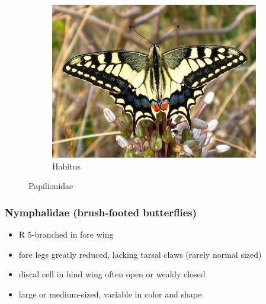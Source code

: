 \documentclass[letterpaper, 11pt]{article}
\begin{document}
\begin{figure}[ht!]
\begin{subfigure}[ht!]{0.5\textwidth}
        \includegraphics[width=\textwidth]{image27}
        \caption{Habitus}
        \label{fig:papilionid2}
    \end{subfigure}
    \caption{Papilionidae}\label{fig:papilionids}
\end{figure}

\subsubsection{Nymphalidae (brush-footed butterflies)}
\begin{itemize}
\item R 5-branched in fore wing
\item fore legs greatly reduced, lacking tarsal claws (rarely normal sized)
\item discal cell in hind wing often open or weakly closed
\item large or medium-sized, variable in color and shape
\end{itemize}
\end{document}
